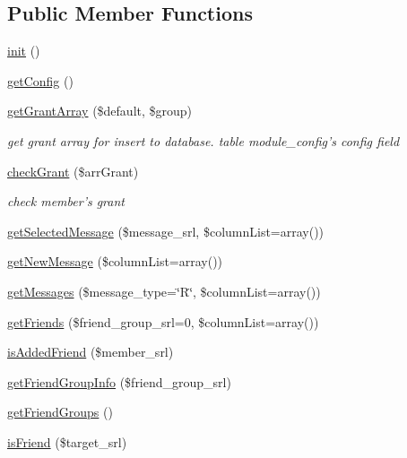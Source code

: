 \subsection*{Public Member Functions}
\begin{DoxyCompactItemize}
\item 
\hyperlink{classcommunicationModel_adff18c028fa89afeb6d7898fde5e2f91}{init} ()
\item 
\hyperlink{classcommunicationModel_ac19b1522d651d098b2d1a6f449a7b340}{get\+Config} ()
\item 
\hyperlink{classcommunicationModel_ac6a10f54e04888eed46f8fdd47b0d872}{get\+Grant\+Array} (\$default, \$group)
\begin{DoxyCompactList}\small\item\em get grant array for insert to database. table module\+\_\+config's config field \end{DoxyCompactList}\item 
\hyperlink{classcommunicationModel_ab4bd61605c27b1777d6322321dd3e421}{check\+Grant} (\$arr\+Grant)
\begin{DoxyCompactList}\small\item\em check member's grant \end{DoxyCompactList}\item 
\hyperlink{classcommunicationModel_a0224512523716ab204f6b91bea82aee4}{get\+Selected\+Message} (\$message\+\_\+srl, \$column\+List=array())
\item 
\hyperlink{classcommunicationModel_a2cc43556cb87f844b82814c2f49000bc}{get\+New\+Message} (\$column\+List=array())
\item 
\hyperlink{classcommunicationModel_ad742daa2376c03b70c5bf6389b10bfe7}{get\+Messages} (\$message\+\_\+type=\char`\"{}R\char`\"{}, \$column\+List=array())
\item 
\hyperlink{classcommunicationModel_a60f69cea7946be0bf4e874f2a5ab2c23}{get\+Friends} (\$friend\+\_\+group\+\_\+srl=0, \$column\+List=array())
\item 
\hyperlink{classcommunicationModel_a47441e7b20018de3fc6ab52bfb9b0d73}{is\+Added\+Friend} (\$member\+\_\+srl)
\item 
\hyperlink{classcommunicationModel_a4ccd810d8c48ef4856da8fe986beb60a}{get\+Friend\+Group\+Info} (\$friend\+\_\+group\+\_\+srl)
\item 
\hyperlink{classcommunicationModel_a670b024aba464aee04e81fd2ae846fc5}{get\+Friend\+Groups} ()
\item 
\hyperlink{classcommunicationModel_a4e291316d5021ded0725169ada2a5dda}{is\+Friend} (\$target\+\_\+srl)
\end{DoxyCompactItemize}
